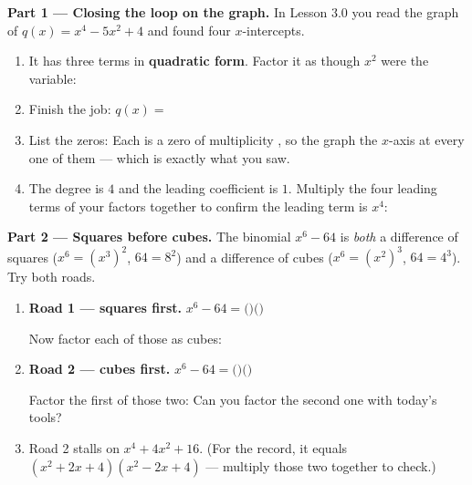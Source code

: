 \documentclass[10pt]{article}
\begin{document}
\begin{tcolorbox}[colback=white, colframe=black!40, title=\textbf{Tier E --- Extension},
    fonttitle=\bfseries, arc=1.5mm, left=3mm, right=3mm, top=2mm, bottom=2mm, breakable]
\textbf{Part 1 --- Closing the loop on the graph.} In Lesson 3.0 you read the graph of
$q(x) = x^4 - 5x^2 + 4$ and found four $x$-intercepts.
\begin{enumerate}[label=(\alph*), leftmargin=1.8em, itemsep=6pt]
  \item It has three terms in \textbf{quadratic form}. Factor it as though $x^2$ were the variable:
  \item Finish the job: \; $q(x) = $ 
  \item List the zeros:  \; Each is a zero of multiplicity , so the graph
         the $x$-axis at every one of them --- which is exactly what you saw.
  \item The degree is $4$ and the leading coefficient is $1$. Multiply the four leading terms of your
        factors together to confirm the leading term is $x^4$: 
\end{enumerate}

\vspace{5pt}
\textbf{Part 2 --- Squares before cubes.} The binomial $x^6 - 64$ is \emph{both} a difference of
squares ($x^6 = (x^3)^2$, $64 = 8^2$) and a difference of cubes ($x^6 = (x^2)^3$, $64 = 4^3$). Try
both roads.
\begin{enumerate}[label=(\alph*), leftmargin=1.8em, itemsep=6pt]
  \item \textbf{Road 1 --- squares first.} \; $x^6 - 64 = ($$)($$)$

        \vspace{2pt}
        Now factor each of those as cubes: 

  \item \textbf{Road 2 --- cubes first.} \; $x^6 - 64 = ($$)($$)$

        \vspace{2pt}
        Factor the first of those two:  \; Can you factor the second one with today's
        tools? 

  \item Road 2 stalls on $x^4 + 4x^2 + 16$. (For the record, it equals $(x^2+2x+4)(x^2-2x+4)$ ---
        multiply those two together to check.) 


\end{enumerate}
\end{tcolorbox}
\end{document}
